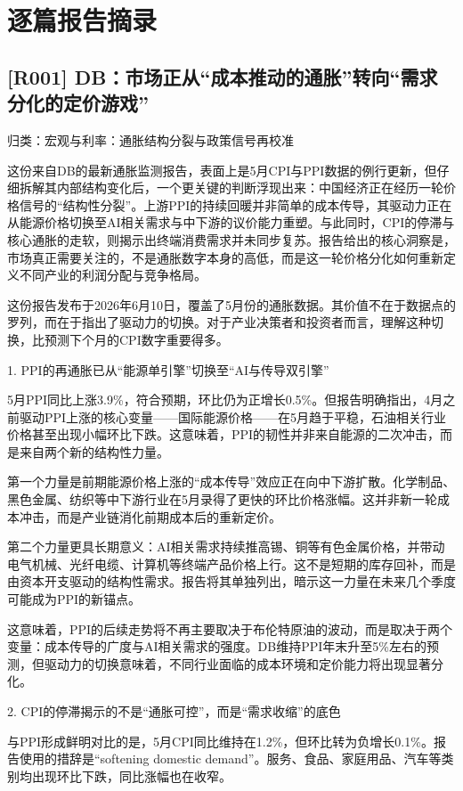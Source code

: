 \documentclass[11pt]{ctexart}
\begin{document}
\section{逐篇报告摘录}
\subsection{[R001] DB：市场正从“成本推动的通胀”转向“需求分化的定价游戏”}
{\small\color{refgray}归类：宏观与利率：通胀结构分裂与政策信号再校准}

这份来自DB的最新通胀监测报告，表面上是5月CPI与PPI数据的例行更新，但仔细拆解其内部结构变化后，一个更关键的判断浮现出来：中国经济正在经历一轮价格信号的“结构性分裂”。上游PPI的持续回暖并非简单的成本传导，其驱动力正在从能源价格切换至AI相关需求与中下游的议价能力重塑。与此同时，CPI的停滞与核心通胀的走软，则揭示出终端消费需求并未同步复苏。报告给出的核心洞察是，市场真正需要关注的，不是通胀数字本身的高低，而是这一轮价格分化如何重新定义不同产业的利润分配与竞争格局。

这份报告发布于2026年6月10日，覆盖了5月份的通胀数据。其价值不在于数据点的罗列，而在于指出了驱动力的切换。对于产业决策者和投资者而言，理解这种切换，比预测下个月的CPI数字重要得多。

1. PPI的再通胀已从“能源单引擎”切换至“AI与传导双引擎”

5月PPI同比上涨3.9\%，符合预期，环比仍为正增长0.5\%。但报告明确指出，4月之前驱动PPI上涨的核心变量——国际能源价格——在5月趋于平稳，石油相关行业价格甚至出现小幅环比下跌。这意味着，PPI的韧性并非来自能源的二次冲击，而是来自两个新的结构性力量。

第一个力量是前期能源价格上涨的“成本传导”效应正在向中下游扩散。化学制品、黑色金属、纺织等中下游行业在5月录得了更快的环比价格涨幅。这并非新一轮成本冲击，而是产业链消化前期成本后的重新定价。

第二个力量更具长期意义：AI相关需求持续推高锡、铜等有色金属价格，并带动电气机械、光纤电缆、计算机等终端产品价格上行。这不是短期的库存回补，而是由资本开支驱动的结构性需求。报告将其单独列出，暗示这一力量在未来几个季度可能成为PPI的新锚点。

这意味着，PPI的后续走势将不再主要取决于布伦特原油的波动，而是取决于两个变量：成本传导的广度与AI相关需求的强度。DB维持PPI年末升至5\%左右的预测，但驱动力的切换意味着，不同行业面临的成本环境和定价能力将出现显著分化。

2. CPI的停滞揭示的不是“通胀可控”，而是“需求收缩”的底色

与PPI形成鲜明对比的是，5月CPI同比维持在1.2\%，但环比转为负增长0.1\%。报告使用的措辞是“softening domestic demand”。服务、食品、家庭用品、汽车等类别均出现环比下跌，同比涨幅也在收窄。
\end{document}
